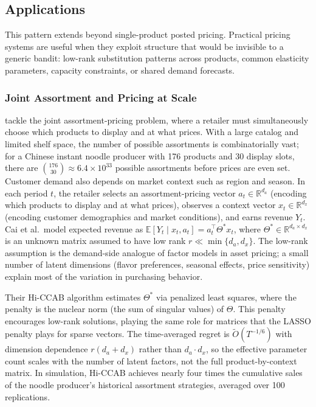 \subsection{Applications}
\label{sec:dp_applications}

This pattern extends beyond single-product posted pricing. Practical pricing systems are useful when they exploit structure that would be invisible to a generic bandit: low-rank substitution patterns across products, common elasticity parameters, capacity constraints, or shared demand forecasts.

\subsubsection{Joint Assortment and Pricing at Scale}

\citet{Cai2023} tackle the joint assortment-pricing problem, where a retailer must simultaneously choose which products to display and at what prices. With a large catalog and limited shelf space, the number of possible assortments is combinatorially vast; for a Chinese instant noodle producer with 176 products and 30 display slots, there are $\binom{176}{30} \approx 6.4 \times 10^{33}$ possible assortments before prices are even set. Customer demand also depends on market context such as region and season. In each period $t$, the retailer selects an assortment-pricing vector $a_t \in \mathbb{R}^{d_a}$ (encoding which products to display and at what prices), observes a context vector $x_t \in \mathbb{R}^{d_x}$ (encoding customer demographics and market conditions), and earns revenue $Y_t$. Cai et al.\ model expected revenue as $\mathbb{E}[Y_t \mid x_t, a_t] = a_t^\top \Theta^* x_t$, where $\Theta^* \in \mathbb{R}^{d_a \times d_x}$ is an unknown matrix assumed to have low rank $r \ll \min\{d_a, d_x\}$. The low-rank assumption is the demand-side analogue of factor models in asset pricing; a small number of latent dimensions (flavor preferences, seasonal effects, price sensitivity) explain most of the variation in purchasing behavior.

Their Hi-CCAB algorithm estimates $\Theta^*$ via penalized least squares, where the penalty is the nuclear norm (the sum of singular values) of $\Theta$. This penalty encourages low-rank solutions, playing the same role for matrices that the LASSO penalty plays for sparse vectors. The time-averaged regret is $\tilde{O}(T^{-1/6})$ with dimension dependence $r(d_a + d_x)$ rather than $d_a \cdot d_x$, so the effective parameter count scales with the number of latent factors, not the full product-by-context matrix. In simulation, Hi-CCAB achieves nearly four times the cumulative sales of the noodle producer's historical assortment strategies, averaged over 100 replications.

